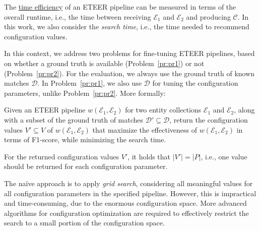 The \underline{time efficiency} of an ETEER pipeline can be measured in terms of the 
overall runtime, i.e., the time between receiving $\mathcal{E}_1$ and $\mathcal{E}_2$ and producing $\mathcal{C}$. 
In this work, we also consider
the \emph{search time}, i.e., the time needed to %
recommend configuration values.


In this context, we address two problems for fine-tuning ETEER pipelines, based on whether a ground truth is available (Problem~\ref{pr:pr1}) or not (Problem~\ref{pr:pr2}).
For the evaluation, we always use the ground truth of known matches $\mathcal{D}$. In Problem~\ref{pr:pr1}, we also use $\mathcal{D}$
for tuning the configuration parameters, unlike Problem~\ref{pr:pr2}.
More formally:

\vspace{4pt}
\begin{problem}\label{pr:pr1}
Given an ETEER pipeline $w(\mathcal{E}_1, \mathcal{E}_2)$ for two entity collections $\mathcal{E}_1$ and $\mathcal{E}_2$, along with a subset of the ground truth of matches $\mathcal{D}' \subseteq \mathcal{D}$, return the configuration values $V' \subseteq V$ of $w(\mathcal{E}_1, \mathcal{E}_2)$ that maximize the effectiveness of $w(\mathcal{E}_1, \mathcal{E}_2)$ in terms of F1-score, while minimizing the search time.
\end{problem}
\vspace{4pt}
For the returned configuration values $V'$, it holds that $|V'| = |P|$, i.e., one value should be returned for each configuration parameter.

The na\"ive approach is to apply \textit{grid search}, considering all meaningful values for all configuration parameters in the specified pipeline. However, this is impractical and time-consuming, due to the enormous configuration space.
More advanced algorithms for configuration optimization are required to effectively restrict the search to a small portion of the configuration space.

